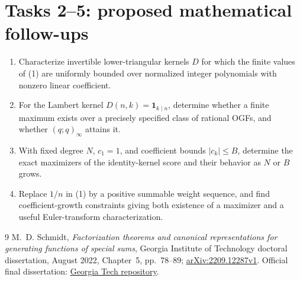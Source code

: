 \documentclass[11pt]{article}
\begin{document}
\section*{Tasks 2--5: proposed mathematical follow-ups}
\begin{enumerate}[label=\textbf{Task \arabic*:},start=2,leftmargin=*]
\item Characterize invertible lower-triangular kernels \(D\) for which
the finite values of (1) are uniformly bounded over normalized
integer polynomials with nonzero linear coefficient.
\item For the Lambert kernel \(D(n,k)=\mathbf1_{k\mid n}\), determine
whether a finite maximum exists over a precisely specified class
of rational OGFs, and whether \((q;q)_\infty\) attains it.
\item With fixed degree \(N\), \(c_1=1\), and coefficient bounds
\(|c_k|\leq B\), determine the exact maximizers of the identity-kernel
score and their behavior as \(N\) or \(B\) grows.
\item Replace \(1/n\) in (1) by a positive summable weight sequence,
and find coefficient-growth constraints giving both existence
of a maximizer and a useful Euler-transform characterization.
\end{enumerate}

\begin{thebibliography}{9}
M.~D. Schmidt, \emph{Factorization theorems and canonical representations
for generating functions of special sums}, Georgia Institute of
Technology doctoral dissertation, August 2022, Chapter~5,
pp.~78--89; \href{https://arxiv.org/abs/2209.12287}{arXiv:2209.12287v1}.
Official final dissertation:
\href{https://repository.gatech.edu/items/f6054390-aaa2-465a-85c2-403619d773ab}
{Georgia Tech repository}.
\end{thebibliography}
\end{document}
